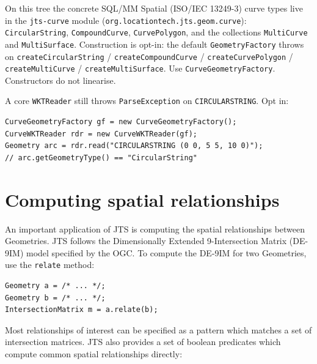 \documentclass[11pt]{article}
\begin{document}
\begin{amendment}
On this tree the concrete SQL/MM Spatial (ISO/IEC 13249-3) curve
types live in the
\texttt{jts-curve} module
(\texttt{org.locationtech.jts.geom.curve}):
\texttt{CircularString}, \texttt{CompoundCurve},
\texttt{CurvePolygon}, and the collections \texttt{MultiCurve} and
\texttt{MultiSurface}. Construction is opt-in: the default
\texttt{GeometryFactory} throws on \texttt{createCircularString} /
\texttt{createCompoundCurve} / \texttt{createCurvePolygon} /
\texttt{createMultiCurve} / \texttt{createMultiSurface}. Use
\texttt{CurveGeometryFactory}. Constructors do not linearise.

A core \texttt{WKTReader} still throws \texttt{ParseException} on
\texttt{CIRCULARSTRING}. Opt in:
\end{amendment}

\begin{lstlisting}
CurveGeometryFactory gf = new CurveGeometryFactory();
CurveWKTReader rdr = new CurveWKTReader(gf);
Geometry arc = rdr.read("CIRCULARSTRING (0 0, 5 5, 10 0)");
// arc.getGeometryType() == "CircularString"
\end{lstlisting}


\section{Computing spatial relationships}
An important application of JTS is computing the spatial relationships
between Geometries. JTS follows the Dimensionally Extended
9-Intersection Matrix (DE-9IM) model specified by the OGC. To compute
the DE-9IM for two Geometries, use the \texttt{relate} method:

\begin{lstlisting}
Geometry a = /* ... */;
Geometry b = /* ... */;
IntersectionMatrix m = a.relate(b);
\end{lstlisting}

Most relationships of interest can be specified as a pattern which
matches a set of intersection matrices. JTS also provides a set of
boolean predicates which compute common spatial relationships
directly:
\end{document}
